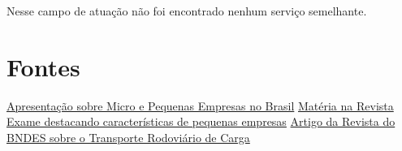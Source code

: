 Nesse campo de atuação não foi encontrado nenhum serviço semelhante.

\section{Fontes}

\href{http://www.slideshare.net/rafaelrezoliveira/micro-epequenasempresas}{Apresentação sobre Micro e Pequenas Empresas no Brasil}
\newline
\href{http://exame.abril.com.br/pme/noticias/o-raio-x-das-pequenas-empresas-brasileiras}{Matéria na Revista Exame destacando características de pequenas empresas}
\newline
\href{http://www.bndes.gov.br/SiteBNDES/export/sites/default/bndes_pt/Galerias/Arquivos/conhecimento/revista/rev2902.pdf}{Artigo da Revista do BNDES sobre o Transporte Rodoviário de Carga}
